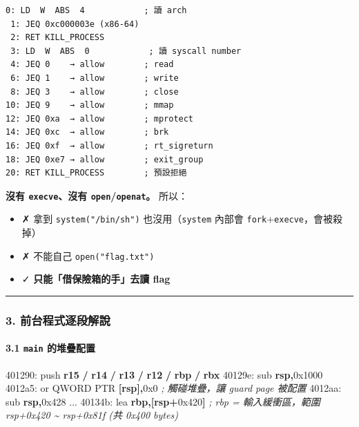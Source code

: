 \documentclass[10pt,a4paper]{article}
\newenvironment{Shaded}{\begin{snugshade}}{\end{snugshade}}
\newcommand{\BaseNTok}[1]{\textcolor[rgb]{0.00,0.00,0.81}{#1}}
\newcommand{\BuiltInTok}[1]{#1}
\newcommand{\CommentTok}[1]{\textcolor[rgb]{0.56,0.35,0.01}{\textit{#1}}}
\newcommand{\DataTypeTok}[1]{\textcolor[rgb]{0.13,0.29,0.53}{#1}}
\newcommand{\KeywordTok}[1]{\textcolor[rgb]{0.13,0.29,0.53}{\textbf{#1}}}
\newcommand{\NormalTok}[1]{#1}
\newcommand{\OperatorTok}[1]{\textcolor[rgb]{0.81,0.36,0.00}{\textbf{#1}}}
\renewenvironment{Shaded}{%
  \def\FrameCommand{\fboxsep=3.2pt\colorbox{shadecolor}}%
  \MakeFramed{\advance\hsize-\width\FrameRestore\small}%
}{%
  \endMakeFramed
}
\providecommand{\tightlist}{%
  \setlength{\itemsep}{0pt}\setlength{\parskip}{0pt}}
\begin{document}
\begin{Verbatim}[breaklines=true,breakanywhere=true,breakautoindent=false,fontsize=\fontsize{7.0}{9.5}\selectfont]
 0: LD  W  ABS  4            ; 讀 arch
 1: JEQ 0xc000003e (x86-64)
 2: RET KILL_PROCESS
 3: LD  W  ABS  0            ; 讀 syscall number
 4: JEQ 0    → allow        ; read
 6: JEQ 1    → allow        ; write
 8: JEQ 3    → allow        ; close
10: JEQ 9    → allow        ; mmap
12: JEQ 0xa  → allow        ; mprotect
14: JEQ 0xc  → allow        ; brk
16: JEQ 0xf  → allow        ; rt_sigreturn
18: JEQ 0xe7 → allow        ; exit_group
20: RET KILL_PROCESS        ; 預設拒絕
\end{Verbatim}

\textbf{沒有 \texttt{execve}、沒有 \texttt{open}/\texttt{openat}。}
所以：

\begin{itemize}
\tightlist
\item
  ✗ 拿到 \texttt{system("/\allowbreak{}bin/\allowbreak{}sh")} 也沒用（\texttt{system} 內部會
  \texttt{fork}+\texttt{execve}，會被殺掉）
\item
  ✗ 不能自己 \texttt{open("flag.\allowbreak{}txt")}
\item
  ✓ \textbf{只能「借保險箱的手」去讀 flag}
\end{itemize}

\begin{center}\rule{0.5\linewidth}{0.5pt}\end{center}

\subsubsection{3.
前台程式逐段解說}\label{ux524dux53f0ux7a0bux5f0fux9010ux6bb5ux89e3ux8aaa}

\paragraph{\texorpdfstring{3.1 \texttt{main}
的堆疊配置}{3.1 main 的堆疊配置}}\label{main-ux7684ux5806ux758aux914dux7f6e}

\begin{Shaded}
\begin{Highlighting}[]
\NormalTok{401290:  }\BuiltInTok{push} \KeywordTok{r15} \OperatorTok{/} \KeywordTok{r14} \OperatorTok{/} \KeywordTok{r13} \OperatorTok{/} \KeywordTok{r12} \OperatorTok{/} \KeywordTok{rbp} \OperatorTok{/} \KeywordTok{rbx}
\NormalTok{40129e:  }\BuiltInTok{sub}  \KeywordTok{rsp}\OperatorTok{,}\BaseNTok{0x1000}
\NormalTok{4012a5:  }\BuiltInTok{or}   \DataTypeTok{QWORD} \DataTypeTok{PTR} \OperatorTok{[}\KeywordTok{rsp}\OperatorTok{],}\BaseNTok{0x0}      \CommentTok{; 觸碰堆疊，讓 guard page 被配置}
\NormalTok{4012aa:  }\BuiltInTok{sub}  \KeywordTok{rsp}\OperatorTok{,}\BaseNTok{0x428}
\NormalTok{...}
\NormalTok{40134b:  }\BuiltInTok{lea}  \KeywordTok{rbp}\OperatorTok{,[}\KeywordTok{rsp}\OperatorTok{+}\BaseNTok{0x420}\OperatorTok{]}          \CommentTok{; rbp = 輸入緩衝區，範圍 rsp+0x420 \textasciitilde{} rsp+0x81f (共 0x400 bytes)}
\end{Highlighting}
\end{Shaded}
\end{document}
